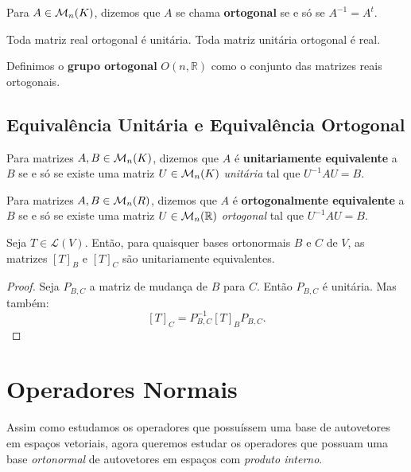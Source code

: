 \documentclass[11pt,twoside,a4paper]{book}
\begin{document}
\begin{definicao}
Para $A\in\mathcal{M}_{n}(K)$, dizemos que $A$ se chama \textbf{ortogonal} se e só se $A^{-1}=A^t$.
\end{definicao}

\begin{observacao}
Toda matriz real ortogonal é unitária. Toda matriz unitária ortogonal é real.
\end{observacao}

\begin{definicao}
Definimos o \textbf{grupo ortogonal} $O(n,\mathbb{R})$ como o conjunto das matrizes reais ortogonais.
\end{definicao}

\subsection{Equivalência Unitária e Equivalência Ortogonal}

\begin{definicao}
Para matrizes $A,B\in\mathcal{M}_{n}(K)$, dizemos que $A$ é \textbf{unitariamente equivalente} a $B$ se e só se existe uma matriz $U\in\mathcal{M}_{n}(K)$ \emph{unitária} tal que $U^{-1}AU=B$.
\end{definicao}

\begin{definicao}
Para matrizes $A,B\in\mathcal{M}_{n}(R)$, dizemos que $A$ é \textbf{ortogonalmente equivalente} a $B$ se e só se existe uma matriz $U\in\mathcal{M}_{n}(\mathbb{R})$ \emph{ortogonal} tal que $U^{-1}AU=B$.
\end{definicao}

\begin{proposicao}
Seja $T\in\mathcal{L}(V)$. Então, para quaisquer bases ortonormais $B$ e $C$ de $V$, as matrizes $[T]_B$ e $[T]_C$ são unitariamente equivalentes.
\end{proposicao}
\begin{proof}
Seja $P_{B,C}$ a matriz de mudança de $B$ para $C$. Então $P_{B,C}$ é unitária. Mas também:
\[
[T]_C=P^{-1}_{B,C}[T]_BP_{B,C}.
\]
\end{proof}

\newpage

\section{Operadores Normais}

Assim como estudamos os operadores que possuíssem uma base de autovetores em espaços vetoriais, agora queremos estudar os operadores que possuam uma base \emph{ortonormal} de autovetores em espaços com \emph{produto interno}.
\end{document}
